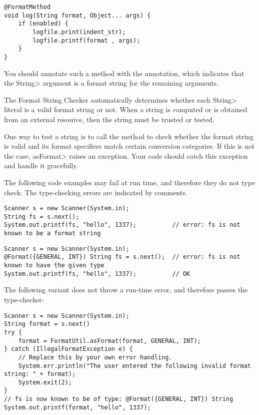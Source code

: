\begin{Verbatim}
@FormatMethod
void log(String format, Object... args) {
    if (enabled) {
        logfile.print(indent_str);
        logfile.printf(format , args);
    }
}
\end{Verbatim}

You should annotate such a method with the
 annotation,
which indicates that the \<String> argument is a format string for the
remaining arguments.




The Format String Checker automatically determines whether each \<String>
literal is a valid format string or not.  When a string is computed or is
obtained from an external resource, then the string must be trusted or tested.

One way to test a string is to call the
method to check whether the format string is valid and its format
specifiers match certain conversion categories.
If this is not the case, \<asFormat> raises an exception.  Your code should
catch this exception and handle it gracefully.

The following code examples may fail at run time, and therefore they do not
type check.  The type-checking errors are indicated by comments.

\begin{Verbatim}
Scanner s = new Scanner(System.in);
String fs = s.next();
System.out.printf(fs, "hello", 1337);          // error: fs is not known to be a format string
\end{Verbatim}

\begin{Verbatim}
Scanner s = new Scanner(System.in);
@Format({GENERAL, INT}) String fs = s.next();  // error: fs is not known to have the given type
System.out.printf(fs, "hello", 1337);          // OK
\end{Verbatim}

\noindent The following variant does not throw a run-time error, and
therefore passes the type-checker:

\begin{Verbatim}
Scanner s = new Scanner(System.in);
String format = s.next()
try {
    format = FormatUtil.asFormat(format, GENERAL, INT);
} catch (IllegalFormatException e) {
    // Replace this by your own error handling.
    System.err.println("The user entered the following invalid format string: " + format);
    System.exit(2);
}
// fs is now known to be of type: @Format({GENERAL, INT}) String
System.out.printf(format, "hello", 1337);
\end{Verbatim}

